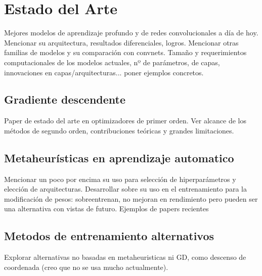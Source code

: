 \section{Estado del Arte}
Mejores modelos de aprendizaje profundo y de redes convolucionales a día de hoy. Mencionar su arquitectura, resultados diferenciales, logros. Mencionar otras familias de modelos y su comparación con convnets. Tamaño y requerimientos computacionales de los modelos actuales, nº de parámetros, de capas, innovaciones en capas/arquitecturas... poner ejemplos concretos.


\subsection{Gradiente descendente}
Paper de estado del arte en optimizadores de primer orden. Ver alcance de los métodos de segundo orden, contribuciones teóricas y grandes limitaciones.

\subsection{Metaheurísticas en aprendizaje automatico}

Mencionar un poco por encima su uso para selección de hiperparámetros y elección de arquitecturas. Desarrollar sobre su uso en el entrenamiento para la modificación de pesos: sobreentrenan, no mejoran en rendimiento pero pueden ser una alternativa con vistas de futuro. Ejemplos de papers recientes

\subsection{Metodos de entrenamiento alternativos}

Explorar alternativas no basadas en metaheuristicas ni GD, como descenso de coordenada (creo que no se usa mucho actualmente). 